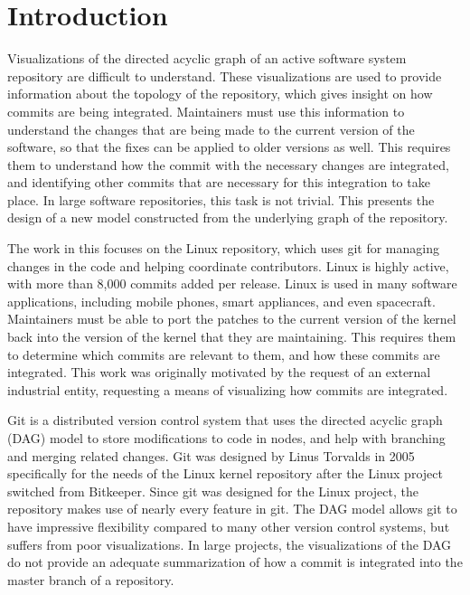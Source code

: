 \chapter{Introduction}

Visualizations of the directed acyclic graph of an active software
system repository are difficult to understand. These visualizations are
used to provide information about the topology of the repository, which
gives insight on how commits are being integrated. Maintainers must use
this information to understand the changes that are being made to the
current version of the software, so that the fixes can be applied to
older versions as well. This requires them to understand how the commit
with the necessary changes are integrated, and identifying other commits
that are necessary for this integration to take place. In large software
repositories, this task is not trivial. This \paper{} presents the
design of a new model constructed from the underlying graph of the
repository.

The work in this \paper{} focuses on the Linux repository, which uses
git for managing changes in the code and helping coordinate
contributors. Linux is highly active, with more than 8,000 commits added
per release. Linux is used in many software applications, including
mobile phones, smart appliances, and even spacecraft. Maintainers must
be able to port the patches to the current version of the kernel back
into the version of the kernel that they are maintaining. This requires
them to determine which commits are relevant to them, and how these
commits are integrated. This work was originally motivated by the
request of an external industrial entity, requesting a means of
visualizing how commits are integrated. 

Git is a distributed version control system that uses the directed
acyclic graph (DAG) model to store modifications to code in nodes, and
help with branching and merging related changes. Git was designed by
Linus Torvalds in 2005 specifically for the needs of the Linux kernel
repository after the Linux project switched from Bitkeeper. Since git
was designed for the Linux project, the repository makes use of nearly
every feature in git. The DAG model allows git to have impressive
flexibility compared to many other version control systems, but suffers
from poor visualizations. In large projects, the visualizations of the
DAG do not provide an adequate summarization of how a commit is
integrated into the master branch of a repository.

